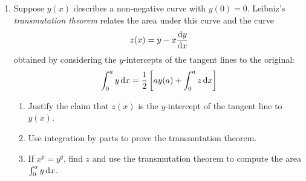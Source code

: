 \begin{exercises}{}{}
\begin{enumerate}
	
		\item%
		Suppose $y(x)$ describes a non-negative curve with $y(0)=0$. Leibniz's \emph{transmutation theorem} relates the area under this curve and the curve
		\[
			z(x)=y-x\diff[y]{x}
		\]
		obtained by considering the $y$-intercepts of the tangent lines to the original:
		\[
			\int_0^a y\,\dx=\frac 12\left[ay(a)+\int_0^a z\,\dx\right]
		\]\vspace{-\parsep}
		\begin{enumerate}
		  \item Justify the claim that $z(x)$ is the $y$-intercept of the tangent line to $y(x)$.
		  \item Use integration by parts to prove the transmutation theorem.
		  \item If $x^p=y^q$, find $z$ and use the transmutation theorem to compute the area $\int_0^a y\,\dx$.
		\end{enumerate}
		
	\end{enumerate}
\end{exercises}

% 
% 
% 	  
% 	  
% 	  
% 	  
% 	  
% 	  


